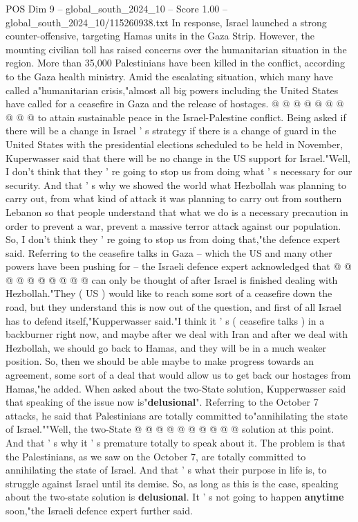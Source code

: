 \begin{textsample}{POS Dim 9 – global\_south\_2024\_10 – Score 1.00 – global\_south\_2024\_10/115260938.txt}
In response, Israel launched a strong counter-offensive, targeting Hamas units in the Gaza Strip.
However, the mounting civilian toll has raised concerns over the humanitarian situation in the region.
More than 35,000 Palestinians have been killed in the conflict, according to the Gaza health ministry.
Amid the escalating situation, which many have called a"humanitarian crisis,"almost all big powers including the United States have called for a ceasefire in Gaza and the release of hostages. @ @ @ @ @ @ @ @ @ @ to attain sustainable peace in the Israel-Palestine conflict.
Being asked if there will be a change in Israel ' s strategy if there is a change of guard in the United States with the presidential elections scheduled to be held in November, Kuperwasser said that there will be no change in the US support for Israel."Well, I don't think that they ' re going to stop us from doing what ' s necessary for our security.
And that ' s why we showed the world what Hezbollah was planning to carry out, from what kind of attack it was planning to carry out from southern Lebanon so that people understand that what we do is a necessary precaution in order to prevent a war, prevent a massive terror attack against our population.
So, I don't think they ' re going to stop us from doing that,"the defence expert said.
Referring to the ceasefire talks in Gaza -- which the US and many other powers have been pushing for -- the Israeli defence expert acknowledged that @ @ @ @ @ @ @ @ @ @ can only be thought of after Israel is finished dealing with Hezbollah."They ( US ) would like to reach some sort of a ceasefire down the road, but they understand this is now out of the question, and first of all Israel has to defend itself,"Kupperwasser said."I think it ' s ( ceasefire talks ) in a backburner right now, and maybe after we deal with Iran and after we deal with Hezbollah, we should go back to Hamas, and they will be in a much weaker position.
So, then we should be able maybe to make progress towards an agreement, some sort of a deal that would allow us to get back our hostages from Hamas,"he added.
When asked about the two-State solution, Kupperwasser said that speaking of the issue now is"\textbf{delusional}".
Referring to the October 7 attacks, he said that Palestinians are totally committed to"annihilating the state of Israel.""Well, the two-State @ @ @ @ @ @ @ @ @ @ solution at this point.
And that ' s why it ' s premature totally to speak about it.
The problem is that the Palestinians, as we saw on the October 7, are totally committed to annihilating the state of Israel.
And that ' s what their purpose in life is, to struggle against Israel until its demise.
So, as long as this is the case, speaking about the two-state solution is \textbf{delusional}.
It ' s not going to happen \textbf{anytime} soon,"the Israeli defence expert further said.

\end{textsample}
